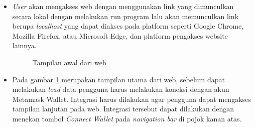 \begin{itemize}
    \item \emph{User} akan mengakses web dengan menggunakan link yang dimunculkan secara lokal dengan melakukan run program lalu akan memunculkan link berupa \emph{localhost} yang dapat diakses pada platform seperti Google Chrome, Mozilla Firefox, atau Microsoft Edge, dan platform pengakses website lainnya.

    \begin{figure} [H] \centering
      \caption{Tampilan awal dari web}
      \label{fig:web_interface}
      \end{figure}

    \item Pada gambar \ref{fig:web_interface} merupakan tampilan utama dari web, sebelum dapat melakukan \emph{load} data pengguna harus melakukan koneksi dengan akun Metamask Wallet. Integrasi harus dilakukan agar pengguna dapat mengakses tampilan lanjutan pada web. Integrasi tersebut dapat dilakukan dengan menekan tombol \emph{Connect Wallet} pada \emph{navigation bar} di pojok kanan atas.
    

\end{itemize}
